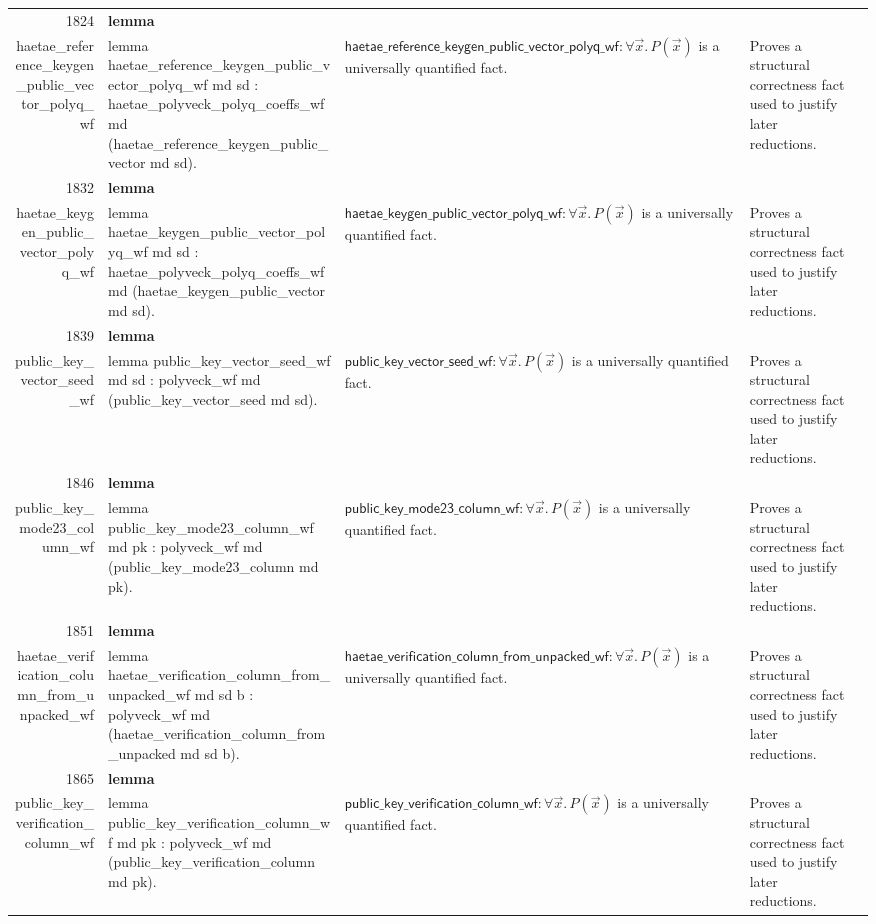 \documentclass[10pt]{article}
\newcommand{\ec}[1]{\begingroup\ttfamily\scriptsize #1\endgroup}
\begin{document}
\begin{longtable}{r L{0.17\textwidth} L{0.26\textwidth} L{0.27\textwidth} L{0.20\textwidth}}
1824 & \textbf{lemma}\\\ec{haetae\_reference\_keygen\_public\_vector\_polyq\_wf} & \ec{lemma haetae\_reference\_keygen\_public\_vector\_polyq\_wf md sd : haetae\_polyveck\_polyq\_coeffs\_wf md (haetae\_reference\_keygen\_public\_vector md sd).} & \(\mathsf{haetae\_reference\_keygen\_public\_vector\_polyq\_wf} : \forall \vec{x}.\, P(\vec{x})\) is a universally quantified fact. & Proves a structural correctness fact used to justify later reductions. \\
1832 & \textbf{lemma}\\\ec{haetae\_keygen\_public\_vector\_polyq\_wf} & \ec{lemma haetae\_keygen\_public\_vector\_polyq\_wf md sd : haetae\_polyveck\_polyq\_coeffs\_wf md (haetae\_keygen\_public\_vector md sd).} & \(\mathsf{haetae\_keygen\_public\_vector\_polyq\_wf} : \forall \vec{x}.\, P(\vec{x})\) is a universally quantified fact. & Proves a structural correctness fact used to justify later reductions. \\
1839 & \textbf{lemma}\\\ec{public\_key\_vector\_seed\_wf} & \ec{lemma public\_key\_vector\_seed\_wf md sd : polyveck\_wf md (public\_key\_vector\_seed md sd).} & \(\mathsf{public\_key\_vector\_seed\_wf} : \forall \vec{x}.\, P(\vec{x})\) is a universally quantified fact. & Proves a structural correctness fact used to justify later reductions. \\
1846 & \textbf{lemma}\\\ec{public\_key\_mode23\_column\_wf} & \ec{lemma public\_key\_mode23\_column\_wf md pk : polyveck\_wf md (public\_key\_mode23\_column md pk).} & \(\mathsf{public\_key\_mode23\_column\_wf} : \forall \vec{x}.\, P(\vec{x})\) is a universally quantified fact. & Proves a structural correctness fact used to justify later reductions. \\
1851 & \textbf{lemma}\\\ec{haetae\_verification\_column\_from\_unpacked\_wf} & \ec{lemma haetae\_verification\_column\_from\_unpacked\_wf md sd b : polyveck\_wf md (haetae\_verification\_column\_from\_unpacked md sd b).} & \(\mathsf{haetae\_verification\_column\_from\_unpacked\_wf} : \forall \vec{x}.\, P(\vec{x})\) is a universally quantified fact. & Proves a structural correctness fact used to justify later reductions. \\
1865 & \textbf{lemma}\\\ec{public\_key\_verification\_column\_wf} & \ec{lemma public\_key\_verification\_column\_wf md pk : polyveck\_wf md (public\_key\_verification\_column md pk).} & \(\mathsf{public\_key\_verification\_column\_wf} : \forall \vec{x}.\, P(\vec{x})\) is a universally quantified fact. & Proves a structural correctness fact used to justify later reductions. \\

\end{longtable}
\end{document}

